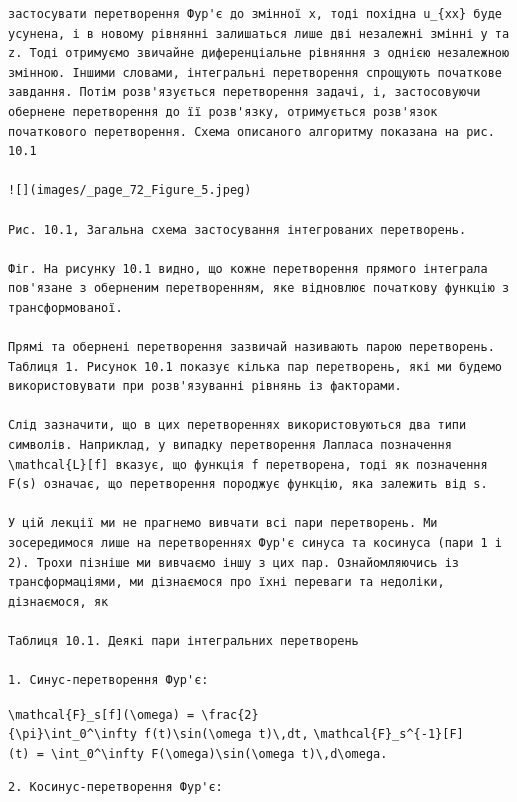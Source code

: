\documentclass[
  ukrainian,
]{article}
\begin{document}
\begin{verbatim}
застосувати перетворення Фур'є до змінної x, тоді похідна u_{xx} буде усунена, і в новому рівнянні залишаться лише дві незалежні змінні y та z. Тоді отримуємо звичайне диференціальне рівняння з однією незалежною змінною. Іншими словами, інтегральні перетворення спрощують початкове завдання. Потім розв'язується перетворення задачі, і, застосовуючи обернене перетворення до її розв'язку, отримується розв'язок початкового перетворення. Схема описаного алгоритму показана на рис. 10.1

![](images/_page_72_Figure_5.jpeg)

Рис. 10.1, Загальна схема застосування інтегрованих перетворень.

Фіг. На рисунку 10.1 видно, що кожне перетворення прямого інтеграла пов'язане з оберненим перетворенням, яке відновлює початкову функцію з трансформованої.

Прямі та обернені перетворення зазвичай називають парою перетворень. Таблиця 1. Рисунок 10.1 показує кілька пар перетворень, які ми будемо використовувати при розв'язуванні рівнянь із факторами.

Слід зазначити, що в цих перетвореннях використовуються два типи символів. Наприклад, у випадку перетворення Лапласа позначення \mathcal{L}[f] вказує, що функція f перетворена, тоді як позначення F(s) означає, що перетворення породжує функцію, яка залежить від s.

У цій лекції ми не прагнемо вивчати всі пари перетворень. Ми зосередимося лише на перетвореннях Фур'є синуса та косинуса (пари 1 і 2). Трохи пізніше ми вивчаємо іншу з цих пар. Ознайомляючись із трансформаціями, ми дізнаємося про їхні переваги та недоліки, дізнаємося, як

Таблиця 10.1. Деякі пари інтегральних перетворень

1. Синус-перетворення Фур'є:
\end{verbatim}

\texttt{\textbackslash{}mathcal\{F\}\_s{[}f{]}(\textbackslash{}omega)\ =\ \textbackslash{}frac\{2\}\{\textbackslash{}pi\}\textbackslash{}int\_0\^{}\textbackslash{}infty\ f(t)\textbackslash{}sin(\textbackslash{}omega\ t)\textbackslash{},dt,}
\texttt{\textbackslash{}mathcal\{F\}\_s\^{}\{-1\}{[}F{]}(t)\ =\ \textbackslash{}int\_0\^{}\textbackslash{}infty\ F(\textbackslash{}omega)\textbackslash{}sin(\textbackslash{}omega\ t)\textbackslash{},d\textbackslash{}omega.}

\begin{verbatim}
2. Косинус-перетворення Фур'є:
\end{verbatim}
\end{document}
